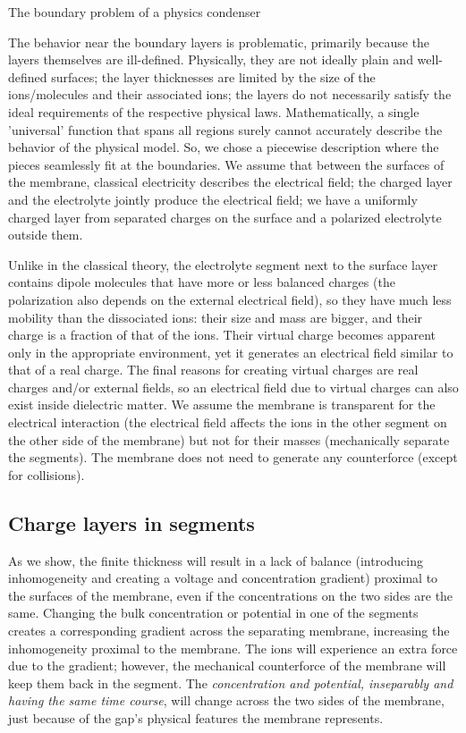 \fi


\ifx\magyar\undefined
{}
{The boundary problem of a physics condenser}
{
The behavior near the boundary layers is problematic, primarily because
the layers themselves are ill-defined.
Physically, they are not ideally plain and well-defined surfaces; the layer thicknesses are limited by the size of the ions/molecules and their associated ions; the layers do not necessarily
satisfy the ideal requirements of the respective physical laws.
Mathematically, a single 'universal' function that spans 
all regions surely cannot accurately describe the behavior
of the physical model. So, we chose a piecewise 
description where the pieces seamlessly fit at the boundaries. We assume that between the surfaces of the membrane, classical
electricity describes the electrical field; the charged layer and the electrolyte jointly produce the electrical field; we have a uniformly charged layer from separated charges on the surface and a polarized electrolyte outside them. 

Unlike in the classical theory, the electrolyte segment next to the surface layer contains dipole molecules
that have more or less balanced charges (the polarization also depends on the external electrical field), so they have much less mobility than the dissociated ions: their size and mass are bigger, and their charge is a fraction of that of the ions.  Their virtual charge becomes apparent only in the appropriate environment, yet it generates an electrical field similar to that of a real charge. The final reasons for creating virtual charges are real charges and/or external fields, so an electrical field due to virtual charges can also exist
inside dielectric matter.
We assume the membrane is transparent
for the electrical interaction (the electrical field affects the ions
in the other segment on the other side of the membrane) but not for
their masses (mechanically separate the segments). 
The membrane does not need to generate any counterforce (except for collisions).
}
\else
\fi

\ifx\magyar\undefined
\subsection{Charge layers in segments\label{sec:Physics-LayersInSegment}}

As we show, the finite thickness will result in
a lack of balance (introducing inhomogeneity and creating a voltage and concentration gradient) proximal to the surfaces of the membrane, even if the concentrations on the two sides are the same. Changing the
bulk concentration or potential in one of the segments creates a corresponding
gradient across the separating membrane, increasing the inhomogeneity proximal to the membrane.
The ions will experience an extra force due to the gradient; however, the mechanical counterforce of the membrane will keep them back in the segment. The \emph{concentration and
	potential, inseparably and having the same time course}, will change
across the two sides of the membrane, just because of the gap's physical
features the membrane represents. 

